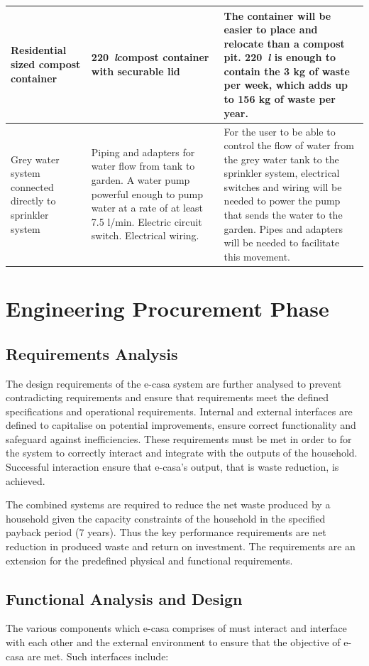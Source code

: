 \documentclass[a4paper,11pt,fleqn]{report}
\begin{document}
\begin{center}
\begin{longtable}{p{3cm}|p{5.5cm}|p{5.5cm}}
            \hline
    Residential sized compost container & 220~\textit{l}compost container with securable lid  & The container will be easier to place and relocate than a compost pit. 220~\textit{l} is enough to contain the 3 kg of waste per week, which adds up to 156 kg of waste per year.\\
            \hline
    Grey water system connected directly to sprinkler system & Piping and adapters for water flow from tank to garden. A water pump powerful enough to pump water at a rate of at least 7.5 l/min. Electric circuit switch. Electrical wiring.  & For the user to be able to control the flow of water from the grey water tank to the sprinkler system, electrical switches and wiring will be needed to power the pump that sends the water to the garden. Pipes and adapters will be needed to facilitate this movement.\\

    \bottomrule
\end{longtable}
\end{center}
%
\section{Engineering Procurement Phase}
\subsection{Requirements Analysis}
The design requirements of the e-casa system are further analysed to prevent contradicting requirements and ensure that requirements meet the defined specifications and operational requirements. Internal and external interfaces are defined to capitalise on potential improvements, ensure correct functionality and safeguard against inefficiencies. These requirements must be met in order to for the system to correctly interact and integrate with the outputs of the household. Successful interaction ensure that e-casa’s output, that is waste reduction, is achieved.

The combined systems are required to reduce the net waste produced by a household given the capacity constraints of the household in the specified payback period (7 years). Thus the key performance requirements are net reduction in produced waste and return on investment. The requirements are an extension for the predefined physical and functional requirements.


\subsection{Functional Analysis and Design}
The various components which e-casa comprises of must interact and interface with each other and the external environment to ensure that the objective of e-casa are met. Such interfaces include:\\
\end{document}
